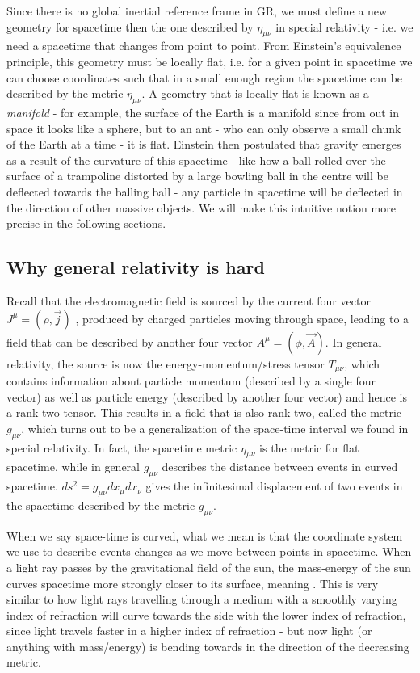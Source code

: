 Since there is no global inertial reference frame in GR, we must define a new geometry for spacetime then the one described by $\eta_{\mu \nu}$ in special relativity - i.e. we need a spacetime that changes from point to point. From Einstein's equivalence principle, this geometry must be locally flat, i.e. for a given point in spacetime we can choose coordinates such that in a small enough region the spacetime can be described by the metric $\eta_{\mu \nu}$. A geometry that is locally flat is known as a \textit{manifold} - for example, the surface of the Earth is a manifold since from out in space it looks like a sphere, but to an ant - who can only observe a small chunk of the Earth at a time - it is flat. Einstein then postulated that gravity emerges as a result of the curvature of this spacetime - like how a ball rolled over the surface of a trampoline distorted by a large bowling ball in the centre will be deflected towards the balling ball - any particle in spacetime will be deflected in the direction of other massive objects. We will make this intuitive notion more precise in the following sections.

\subsection{Why general relativity is hard}
Recall that the electromagnetic field is sourced by the current four vector $J^\mu=\left(\rho, \Vec{j}\right)$ , produced by charged particles moving through space, leading to a field that can be described by another four vector $A^\mu=(\phi, \Vec{A})$. In general relativity, the source is now the energy-momentum/stress tensor $T_{\mu \nu}$, which contains information about particle momentum (described by a single four vector) as well as particle energy (described by another four vector) and hence is a rank two tensor. This results in a field that is also rank two, called the metric $g_{\mu \nu}$, which turns out to be a generalization of the space-time interval we found in special relativity. In fact, the spacetime metric $\eta_{\mu \nu}$ is the metric for flat spacetime, while in general $g_{\mu\nu}$ describes the distance between events in curved spacetime. $ds^2 = g_{\mu \nu} dx_\mu dx_\nu$ gives the infinitesimal displacement of two events in the spacetime described by the metric $g_{\mu \nu}$.

When we say space-time is curved, what we mean is that the coordinate system we use to describe events changes as we move between points in spacetime. When a light ray passes by the gravitational field of the sun, the mass-energy of the sun curves spacetime more strongly closer to its surface, meaning . This is very similar to how light rays travelling through a medium with a smoothly varying index of refraction will curve towards the side with the lower index of refraction, since light travels faster in a higher index of refraction - but now light (or anything with mass/energy) is bending towards in the direction of the decreasing metric.

